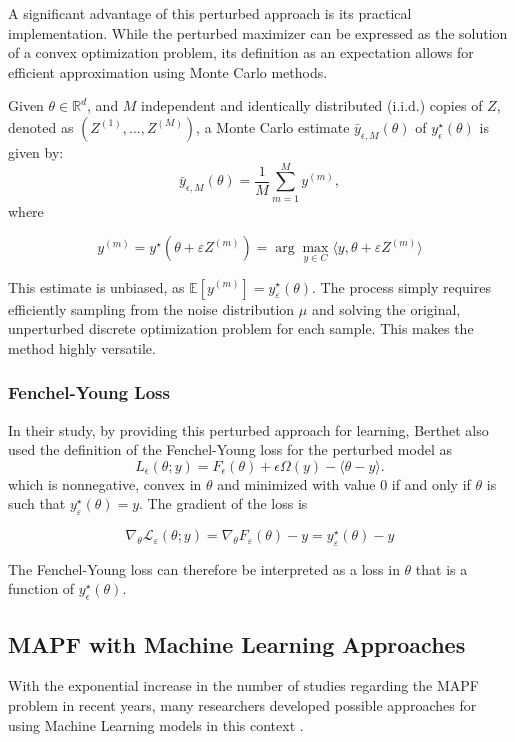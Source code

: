 A significant advantage of this perturbed approach is its practical implementation. While the perturbed maximizer can be expressed as the solution of a convex optimization problem, its definition as an expectation allows for efficient approximation using Monte Carlo methods. 

Given $\theta \in \mathbb{R}^d$, and $M$ independent and identically distributed (i.i.d.) copies of $Z$, denoted as $(Z^{(1)}, \dots, Z^{(M)})$, a Monte Carlo estimate $\bar{y}_{\epsilon,M}(\theta)$ of $y^\star_\epsilon(\theta)$ is given by: 
\[
\bar{y}_{\epsilon,M}(\theta) = \frac{1}{M} \sum_{m=1}^M y^{(m)}, \tag{8}
\]
where

\[
y^{(m)} = y^\star(\theta + \varepsilon Z^{(m)}) = \arg \max_{y \in C} \langle y, \theta + \varepsilon Z^{(m)} \rangle \tag{9}
\]

This estimate is unbiased, as $\mathbb{E}[y^{(m)}] = y^\star_\varepsilon(\theta)$. The process simply requires efficiently sampling from the noise distribution $\mu$ and solving the original, unperturbed discrete optimization problem for each sample. This makes the method highly versatile. 

\subsubsection{Fenchel-Young Loss}

In their study, by providing this perturbed approach for learning, Berthet also used the definition of the Fenchel-Young loss \cite{blondelLearningFenchelYoungLosses} for the perturbed model as
\[
L_\epsilon (\theta;y) = F_\epsilon (\theta) + \epsilon \Omega(y) - \langle \theta - y \tag{10}\rangle.
\]
which is nonnegative, convex in \(\theta\) and minimized with value 0 if and only if \(\theta\) is such that \(y^\star_\varepsilon(\theta) = y\). The gradient of the loss is

\[
\nabla_\theta \mathcal{L}_\varepsilon(\theta; y) = \nabla_\theta F_\varepsilon(\theta) - y = y^\star_\varepsilon(\theta) - y \tag{11}
\]

The Fenchel-Young loss can therefore be interpreted as a loss in $\theta$ that is a function of \(y^\star_\epsilon(\theta)\).


\subsection{MAPF with Machine Learning Approaches}

With the exponential increase in the number of studies regarding the MAPF problem in recent years, many researchers developed possible approaches for using Machine Learning models in this context \cite{wangWherePathsCollide2025}.

